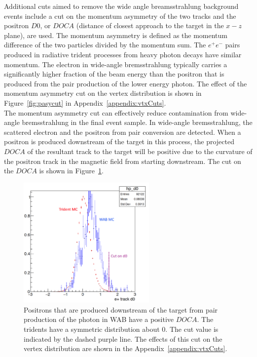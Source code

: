 \indent Additional cuts aimed to remove the wide angle breamsstrahlung background events include a cut on the momentum asymmetry of the two tracks and the positron $D0$, or $DOCA$ (distance of closest approach to the target in the $x-z$ plane), are used. The momentum asymmetry is defined as the momentum difference of the two particles divided by the momentum sum. The $e^+e^-$ pairs produced in radiative trident processes from heavy photon decays have similar momentum. The electron in wide-angle bremsstrahlung typically carries a significantly higher fraction of the beam energy than the positron that is produced from the pair production of the lower energy photon. The effect of the momentum asymmetry cut on the vertex distribution is shown in Figure~\ref{fig:pasycut} in Appendix~\ref{appendix:vtxCuts}.\\
\indent The momentum asymmetry cut can effectively reduce contamination from wide-angle bremsstrahlung in the final event sample. In wide-angle bremsstrahlung, the scattered electron and the positron from pair conversion are detected. When a positron is produced downstream of the target in this process, the projected $DOCA$ of the resultant track to the target will be positive due to the curvature of the positron track in the magnetic field from starting downstream. The cut on the $DOCA$ is shown in Figure~\ref{fig:docacut}. 
\begin{figure}[htb]
  \centering
      \includegraphics[width=0.6\textwidth]{pics/searching/epd0cut.png}
  \caption[Cut on the $e^+$ $DOCA$ to remove WAB]{Positrons that are produced downstream of the target from pair production of the photon in WAB have a positive $DOCA$. The tridents have a symmetric distribution about 0. The cut value is indicated by the dashed purple line. The effects of this cut on the vertex distribution are shown in the Appendix~\ref{appendix:vtxCuts}.}
  \label{fig:docacut}
\end{figure} 
